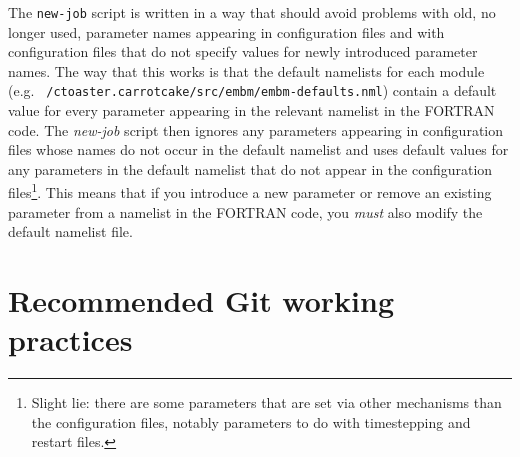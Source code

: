 \documentclass[a4paper,10pt,article]{memoir}
\begin{document}
The \texttt{new-job} script is written in a way that should avoid
problems with old, no longer used, parameter names appearing in
configuration files and with configuration files that do not specify
values for newly introduced parameter names.  The way that this works
is that the default namelists for each module
(e.g. \texttt{~/ctoaster.carrotcake/src/embm/embm-defaults.nml}) contain a default
value for every parameter appearing in the relevant namelist in the
FORTRAN code.  The \emph{new-job} script then ignores any parameters
appearing in configuration files whose names do not occur in the
default namelist and uses default values for any parameters in the
default namelist that do not appear in the configuration
files\footnote{Slight lie: there are some parameters that are set via
  other mechanisms than the configuration files, notably parameters to
  do with timestepping and restart files.}.  This means that if you
introduce a new parameter or remove an existing parameter from a
namelist in the FORTRAN code, you \emph{must} also modify the default
namelist file.

\section{Recommended Git working practices}
\label{sec:git-practices}
\end{document}
